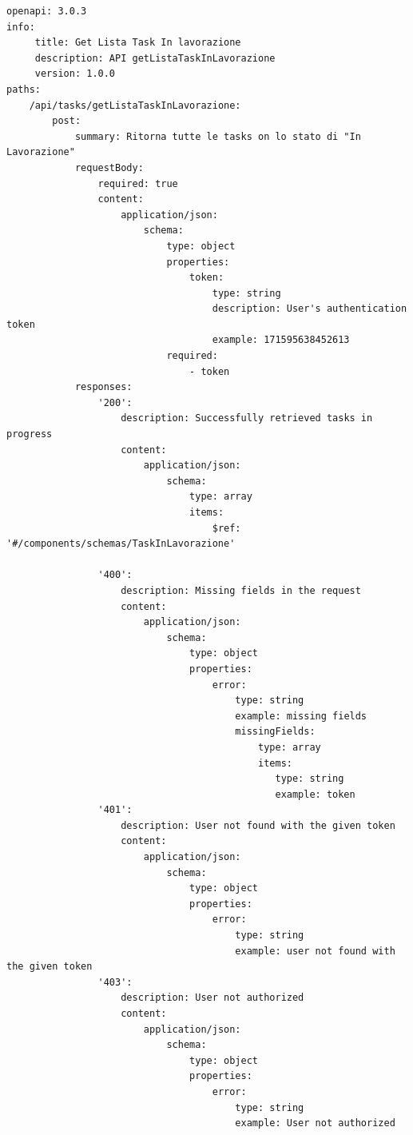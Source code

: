 \documentclass{report}
\begin{document}
\begin{verbatim}
openapi: 3.0.3
info:
     title: Get Lista Task In lavorazione
     description: API getListaTaskInLavorazione
     version: 1.0.0
paths:
    /api/tasks/getListaTaskInLavorazione:
        post:
            summary: Ritorna tutte le tasks on lo stato di "In Lavorazione"
            requestBody:
                required: true
                content:
                    application/json:
                        schema:
                            type: object
                            properties:
                                token:
                                    type: string
                                    description: User's authentication token
                                    example: 171595638452613
                            required:
                                - token
            responses:
                '200':
                    description: Successfully retrieved tasks in progress
                    content:
                        application/json:
                            schema:
                                type: array
                                items:
                                    $ref: '#/components/schemas/TaskInLavorazione'

                '400':
                    description: Missing fields in the request
                    content:
                        application/json:
                            schema:
                                type: object
                                properties:
                                    error:
                                        type: string
                                        example: missing fields
                                        missingFields:
                                            type: array
                                            items:
                                               type: string
                                               example: token
                '401':
                    description: User not found with the given token
                    content:
                        application/json:
                            schema:
                                type: object
                                properties:
                                    error:
                                        type: string
                                        example: user not found with the given token
                '403':
                    description: User not authorized
                    content:
                        application/json:
                            schema:
                                type: object
                                properties:
                                    error:
                                        type: string
                                        example: User not authorized

\end{verbatim}
\end{document}
